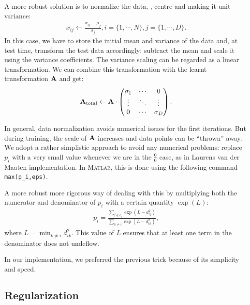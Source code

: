 	A more robust solution is to normalize the
        data, \ie, centre and making it unit variance:
        \begin{align}
            x_{ij} \leftarrow \frac{x_{ij} - \mu_j}{\sigma_j}, i =
	    \{1,\cdots,N\}, j = \{1,\cdots,D\}.
        \end{align}
        In this case, we have to store the initial mean and variance of the data
        and, at test time, transform the test data accordingly: subtract the mean and scale it using the variance coefficients. The variance scaling can be regarded as a linear transformation. We can combine this transformation with the learnt transformation $\mathbf{A}$ and get:
        \begin{align}
            \mathbf{A}_{\text{total}} \leftarrow \mathbf{A}  \cdot \begin{pmatrix}
                  \sigma_1 &  \cdots & 0 \\
                  \vdots  &   \ddots & \vdots  \\
                  0 & \cdots & \sigma_D
                 \end{pmatrix}.
        \end{align}

	
	In general, data normalization avoids numerical issues for the first iterations. But during training, the scale of $\mathbf{A}$ increases and data points can be ``thrown'' away. We adopt a rather simplistic approach to avoid any numerical problems: replace $p_i$ with a very small value whenever we are in the $\frac{0}{0}$ case, as in Laurens van der Maaten implementation. In \textsc{Matlab}, this is done using the following command \texttt{max(p\_i,eps)}. 
    
	A more robust more rigorous way of dealing with this by multiplying both the numerator and denominator of $p_i$ with a certain quantity $\exp(L)$:
	\begin{align}
	  p_i = \frac{\sum_{j\in c_i} \exp(L-d_{ij}^2)}{\sum_{k\neq i} \exp(L-d_{ik}^2)},
	\end{align}
	where $L = \min_{k\neq i} d_{ik}^2$. This value of $L$ ensures that at least one term in the denominator does not undeflow.

	In our implementation, we preferred the previous trick because of its simplicity and speed.

\subsection{Regularization}
\label{subsec:regularization}

